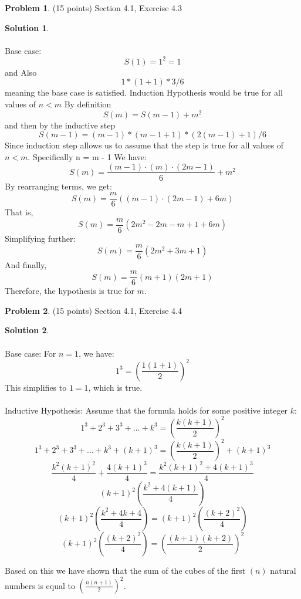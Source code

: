 \documentclass{article}
\theoremstyle{definition}
\newtheorem{problem}{Problem}
\newtheorem*{solution}{Solution}
\begin{document}
\newpage
\begin{problem} (15 points) Section 4.1, Exercise 4.3
\end{problem}
\begin{solution}
  ~\\
  ~\\
  Base case:
  \[
    S(1) = 1^2 = 1\] and Also \[1 * (1+1) * 3/6
  \]
  meaning the base case is satisfied. Induction Hypothesis would be true for all
  values of $n < m$ By definition
  \[
    S(m) = S(m - 1) + m^2
  \]
  and then by the inductive step
  \[
    S(m - 1) = (m - 1) * (m - 1 + 1) * (2(m - 1)+1)/6
  \]
  Since induction step allows us to assume that the step is true for all values
  of $n < m$. Specifically n = m - 1 We have:
  \[
    S(m) = \frac{(m - 1) \cdot (m) \cdot (2m - 1)}{6} + m^2
  \]
  By rearranging terms, we get:
  \[
    S(m) = \frac{m}{6} \left( (m - 1) \cdot (2m - 1) + 6m \right)
  \]
  That is,
  \[
    S(m) = \frac{m}{6} \left( 2m^2 - 2m - m + 1 + 6m \right)
  \]
  Simplifying further:
  \[
    S(m) = \frac{m}{6} \left( 2m^2 + 3m + 1 \right)
  \]
  And finally,
  \[
    S(m) = \frac{m}{6} (m+1)(2m + 1)
  \]
  Therefore, the hypothesis is true for \(m\).

\end{solution}
\newpage
\begin{problem} (15 points) Section 4.1, Exercise 4.4
\end{problem}
\begin{solution}
  ~\\
  ~\\
  Base case:
  For \(n = 1\), we have:
  \[
    1^3 = \left(\frac{1(1+1)}{2}\right)^2
  \]
  This simplifies to \(1 = 1\), which is true. ~\\ ~\\ Inductive Hypothesis:
  Assume that the formula holds for some positive integer \(k\):
  \[
    1^3 + 2^3 + 3^3 + \ldots + k^3 = \left(\frac{k(k+1)}{2}\right)^2
  \]
  \[
    1^3 + 2^3 + 3^3 + \ldots + k^3 + (k+1)^3 = \left(\frac{k(k+1)}{2}\right)^2 + (k+1)^3
  \]
  \[
    \frac{k^2(k+1)^2}{4} + \frac{4(k+1)^3}{4} = \frac{k^2(k+1)^2 + 4(k+1)^3}{4}
  \]
  \[
    (k+1)^2\left(\frac{k^2 + 4(k+1)}{4}\right)
  \]
  \[
    (k+1)^2\left(\frac{k^2 + 4k + 4}{4}\right) = (k+1)^2\left(\frac{(k+2)^2}{4}\right)
  \]
  \[
    (k+1)^2\left(\frac{(k+2)^2}{4}\right) = \left(\frac{(k+1)(k+2)}{2}\right)^2
  \]

  Based on this we have shown that the sum of the cubes of the first $(n)$
  natural numbers is equal to $\left(\frac{n(n+1)}{2}\right)^2$.
\end{solution}
\end{document}
